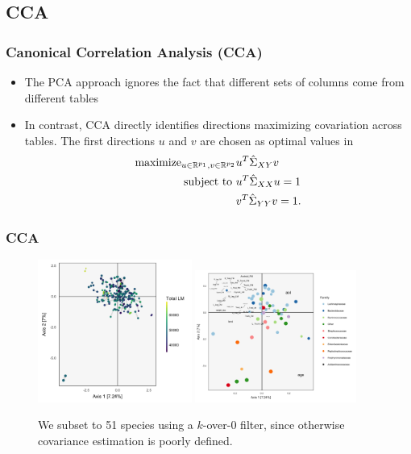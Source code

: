 \documentclass{beamer}
\begin{document}
\subsection{CCA}
\label{subsec:CCA}

\begin{frame}
  \frametitle{Canonical Correlation Analysis (CCA)}
\begin{itemize}
\item The PCA approach ignores the fact that different sets of columns come from
  different tables
\item In contrast, CCA directly identifies directions maximizing
  covariation across tables. The first directions $u$ and $v$ are chosen as
  optimal values in
\begin{align*}
  \text{maximize}_{u \in \mathbb{R}^{p_{1}}, v \in \mathbb{R}^{p_{2}}}
  &u^{T}\hat{\Sigma}_{XY}v \\
  \text{subject to } & u^{T}\hat{\Sigma}_{XX}u = 1 \nonumber \\
  & v^{T}\hat{\Sigma}_{YY}v = 1. \nonumber
\end{align*}
\end{itemize}
\end{frame}

\begin{frame}
  \frametitle{CCA}
  \begin{figure}[ht]
    \centering
    \includegraphics[width=0.45\textwidth]{figure/cca_scores_lm}
    \includegraphics[width=0.47\textwidth]{figure/cca_loadings}
    \caption{We subset to 51 species using a $k$-over-$0$ filter, since
      otherwise covariance estimation is poorly defined.
      \label{fig:cca_scores}}
  \end{figure}
\end{frame}
\end{document}
